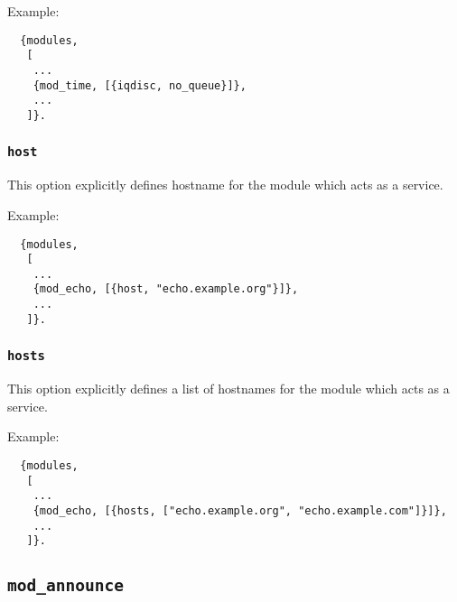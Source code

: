 \documentclass[a4paper,10pt]{article}
\newcommand{\option}[1]{\texttt{#1}}
\newcommand{\module}[1]{\texttt{#1}}
\newcommand{\modannounce}{\module{mod\_announce}}
\begin{document}
Example:
\begin{verbatim}
  {modules,
   [
    ...
    {mod_time, [{iqdisc, no_queue}]},
    ...
   ]}.
\end{verbatim}

\subsubsection{\option{host}}
\label{sec:modhostoption}

This option explicitly defines hostname for the module which acts as a service.

Example:
\begin{verbatim}
  {modules,
   [
    ...
    {mod_echo, [{host, "echo.example.org"}]},
    ...
   ]}.
\end{verbatim}

\subsubsection{\option{hosts}}
\label{sec:modhostsoption}

This option explicitly defines a list of hostnames for the module which acts as
a service.

Example:
\begin{verbatim}
  {modules,
   [
    ...
    {mod_echo, [{hosts, ["echo.example.org", "echo.example.com"]}]},
    ...
   ]}.
\end{verbatim}


\subsection{\modannounce{}}
\label{sec:modannounce}
\end{document}
